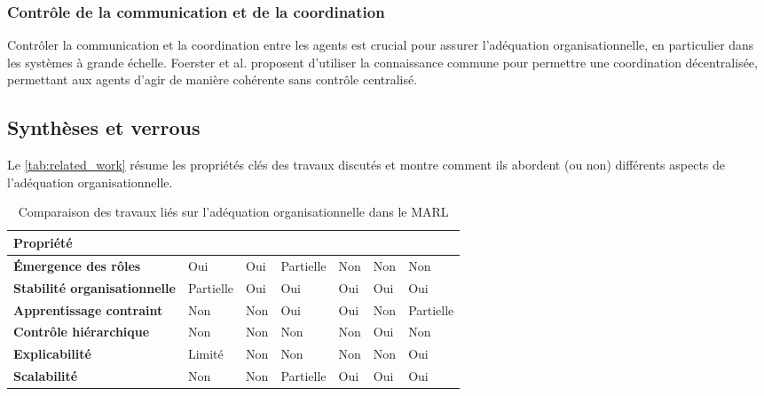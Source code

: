 \documentclass[sigconf,anonymous]{aamas}
\begin{document}
\subsubsection{Contrôle de la communication et de la coordination}
Contrôler la communication et la coordination entre les agents est crucial pour assurer l'adéquation organisationnelle, en particulier dans les systèmes à grande échelle. Foerster et al. \cite{foerster2018communication} proposent d'utiliser la connaissance commune pour permettre une coordination décentralisée, permettant aux agents d'agir de manière cohérente sans contrôle centralisé.

\subsection{Synthèses et verrous}
Le \autoref{tab:related_work} résume les propriétés clés des travaux discutés et montre comment ils abordent (ou non) différents aspects de l'adéquation organisationnelle.

\begin{table}[ht]
    \centering
    \small
    \renewcommand{\arraystretch}{1.3}
    \caption{Comparaison des travaux liés sur l'adéquation organisationnelle dans le MARL}
    \label{tab:related_work}
    \begin{tabular}{m{2.1cm} >{\centering\arraybackslash}m{0.8cm} >{\centering\arraybackslash}m{0.5cm} >{\centering\arraybackslash}m{0.8cm} >{\centering\arraybackslash}m{0.5cm} >{\centering\arraybackslash}m{0.5cm} >{\centering\arraybackslash}m{0.8cm}}

        \textbf{Propriété} & \textbf{\cite{yang2021role}} & \textbf{\cite{grover2018role}} & \textbf{\cite{borsa2019constrained}} & \textbf{\cite{zhang2020safemarl}} & \textbf{\cite{ghavamzadeh2006hrl}} & \textbf{\cite{foerster2018communication}} \\
        \hline \vspace{0.2cm}
        \textbf{Émergence des rôles} & Oui & Oui & Partielle & Non & Non & Non \\
        \textbf{Stabilité organisationnelle} & Partielle & Oui & Oui & Oui & Oui & Oui \\
        \textbf{Apprentissage contraint} & Non & Non & Oui & Oui & Non & Partielle \\
        \textbf{Contrôle hiérarchique} & Non & Non & Non & Non & Oui & Non \\
        \textbf{Explicabilité} & Limité & Non & Non & Non & Non & Oui \\
        \textbf{Scalabilité} & Non & Non & Partielle & Oui & Oui & Oui
    \end{tabular}%
\end{table}
\end{document}

